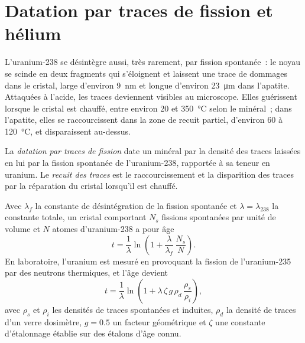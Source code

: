 \section{Datation par traces de fission et hélium}\label{sec:b3:advanced-geochronology:low-t}

L'uranium-238 se désintègre aussi, très rarement, par fission spontanée~: le noyau
se scinde en deux fragments qui s'éloignent et laissent une trace de dommages dans le
cristal, large d'environ \qty{9}{nm} et longue d'environ \qty{23}{\micro\metre} dans
l'apatite. Attaquées à l'acide, les traces deviennent visibles au microscope.
Elles guérissent lorsque le cristal est chauffé, entre environ 20 et \qty{350}{\celsius}
selon le minéral~; dans l'apatite, elles se raccourcissent dans la zone de recuit partiel,
d'environ 60 à \qty{120}{\celsius}, et disparaissent au-dessus.

\begin{definition}\label{def:b3:advanced-geochronology:fission-track}
La \emph{datation par traces de fission} date un minéral par
la densité des traces laissées en lui par la fission spontanée de
l'uranium-238, rapportée à sa teneur en uranium. Le \emph{recuit des
traces} est le raccourcissement et la disparition des
traces par la réparation du cristal lorsqu'il est chauffé.
\end{definition}

\begin{theorem}\label{thm:b3:advanced-geochronology:fission-track}
Avec $\lambda_f$ la constante de désintégration de la fission spontanée et $\lambda =
\lambda_{238}$ la constante totale, un cristal comportant $N_s$ fissions spontanées par unité
de volume et $N$ atomes d'uranium-238 a pour âge
\[
t = \frac1\lambda\ln\left(1 + \frac{\lambda}{\lambda_f}\,\frac{N_s}{N}\right).
\]
En laboratoire, l'uranium est mesuré en provoquant la fission de
l'uranium-235 par des neutrons thermiques, et l'âge devient
\[
t = \frac1\lambda\ln\left(1 + \lambda\,\zeta\,g\,\rho_d\,\frac{\rho_s}{\rho_i}\right),
\]
avec $\rho_s$ et $\rho_i$ les densités de traces spontanées et induites,
$\rho_d$ la densité de traces d'un verre dosimètre, $g = 0.5$ un facteur
géométrique et $\zeta$ une constante d'étalonnage établie sur des étalons d'âge connu.
\end{theorem}

